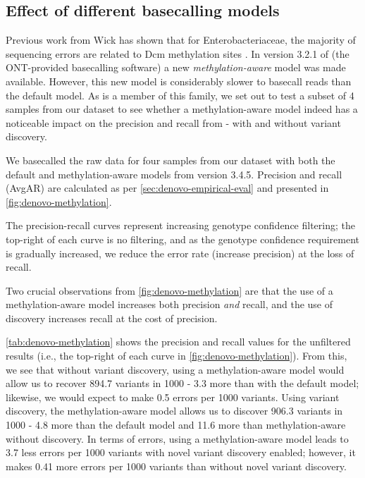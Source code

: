 \subsection{Effect of different \ont{} basecalling models}
\label{sec:denovo-methylation}

Previous work from Wick \etal{} has shown that for Enterobacteriaceae, the majority of \ont{} sequencing errors are related to Dcm methylation sites \cite{wick2019}. In version 3.2.1 of \guppy{} (the ONT-provided basecalling software) a new \emph{methylation-aware} model was made available. However, this new model is considerably slower to basecall reads than the default model. As \ecoli{} is a member of this family, we set out to test a subset of 4 samples from our dataset to see whether a methylation-aware model indeed has a noticeable impact on the precision and recall from \pandora{} - with and without \denovo{} variant discovery.

We basecalled the raw data for four samples from our dataset with both the default and methylation-aware models from \guppy{} version 3.4.5. Precision and recall (AvgAR) are calculated as per \autoref{sec:denovo-empirical-eval} and presented in \autoref{fig:denovo-methylation}. 

The precision-recall curves represent increasing genotype confidence filtering; the top-right of each curve is no filtering, and as the genotype confidence requirement is gradually increased, we reduce the error rate (increase precision) at the loss of recall. 

Two crucial observations from \autoref{fig:denovo-methylation} are that the use of a methylation-aware model increases both precision \emph{and} recall, and the use of \denovo{} discovery increases recall at the cost of precision. 

\autoref{tab:denovo-methylation} shows the precision and recall values for the unfiltered results (i.e., the top-right of each curve in \autoref{fig:denovo-methylation}). From this, we see that without \denovo{} variant discovery, using a methylation-aware model would allow us to recover 894.7 variants in 1000 - 3.3 more than with the default model; likewise, we would expect to make 0.5 errors per 1000 variants. Using \denovo{} variant discovery, the methylation-aware model allows us to discover 906.3 variants in 1000 - 4.8 more than the default model and 11.6 more than methylation-aware without \denovo{} discovery. In terms of errors, using a methylation-aware model leads to 3.7 less errors per 1000 variants with novel variant discovery enabled; however, it makes 0.41 more errors per 1000 variants than without novel variant discovery. 

